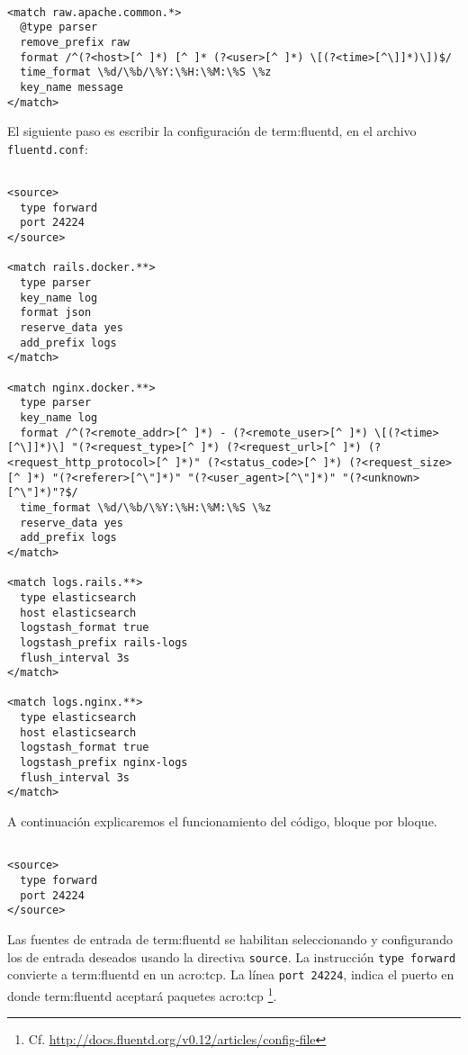 \begin{lstlisting}

<match raw.apache.common.*>
  @type parser
  remove_prefix raw
  format /^(?<host>[^ ]*) [^ ]* (?<user>[^ ]*) \[(?<time>[^\]]*)\])$/
  time_format \%d/\%b/\%Y:\%H:\%M:\%S \%z
  key_name message
</match>

\end{lstlisting}

El siguiente paso es escribir la configuración de \gls{term:fluentd}, en el
archivo \texttt{fluentd.conf}:

\begin{lstlisting}

<source>
  type forward
  port 24224
</source>

<match rails.docker.**>
  type parser
  key_name log
  format json
  reserve_data yes
  add_prefix logs
</match>

<match nginx.docker.**>
  type parser
  key_name log
  format /^(?<remote_addr>[^ ]*) - (?<remote_user>[^ ]*) \[(?<time>[^\]]*)\] "(?<request_type>[^ ]*) (?<request_url>[^ ]*) (?<request_http_protocol>[^ ]*)" (?<status_code>[^ ]*) (?<request_size>[^ ]*) "(?<referer>[^\"]*)" "(?<user_agent>[^\"]*)" "(?<unknown>[^\"]*)"?$/
  time_format \%d/\%b/\%Y:\%H:\%M:\%S \%z
  reserve_data yes
  add_prefix logs
</match>

<match logs.rails.**>
  type elasticsearch
  host elasticsearch
  logstash_format true
  logstash_prefix rails-logs
  flush_interval 3s
</match>

<match logs.nginx.**>
  type elasticsearch
  host elasticsearch
  logstash_format true
  logstash_prefix nginx-logs
  flush_interval 3s
</match>

\end{lstlisting}

A continuación explicaremos el funcionamiento del código, bloque por bloque.

\begin{lstlisting}

<source>
  type forward
  port 24224
</source>

\end{lstlisting}

Las fuentes de entrada de \gls{term:fluentd} se habilitan seleccionando y
configurando los  de entrada deseados usando la directiva
\lstinline{source}. La instrucción \lstinline{type forward} convierte a
\gls{term:fluentd} en un  \gls{acro:tcp}. La línea
\lstinline{port 24224}, indica el puerto en donde \gls{term:fluentd} aceptará
paquetes \gls{acro:tcp} \footnote{Cf.
\url{http://docs.fluentd.org/v0.12/articles/config-file}}.


